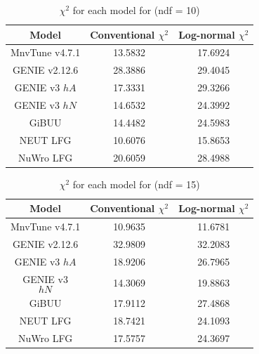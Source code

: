 \documentclass[aps,prl,twocolumn,showpacs,superscriptaddress,letterpaper,showkeys,superscriptaddress,floatfix,nofootinbib]{revtex4-1}
\begin{document}
\begin{table}[H]
  \centering
  \renewcommand{\arraystretch}{1.15}
  \caption{$\chi^2$ for each model for \ptmu (ndf = 10)}
    \begin{tabular}{c||c|c}
        Model & Conventional $\chi^2$ & Log-normal $\chi^2$ \\
        \hline
        \hline
            MnvTune v4.7.1 & 13.5832 & 17.6924\\
            GENIE v2.12.6 & 28.3886 & 29.4045\\
            GENIE v3 $hA$  & 17.3331 & 29.3266\\
            GENIE v3 $hN$  & 14.6532 & 24.3992\\ 
            GiBUU & 14.4482 & 24.5983\\ 
            NEUT LFG & 10.6076 & 15.8653\\
            NuWro LFG & 20.6059 & 28.4988\\ 
    \end{tabular}
  \label{tbl:chi2_ptmu}
\end{table}

\begin{table}[H]
  \centering
  \renewcommand{\arraystretch}{1.15}
  \caption{$\chi^2$ for each model for \thmu (ndf = 15)}
    \begin{tabular}{c||c|c}
        Model & Conventional $\chi^2$ & Log-normal $\chi^2$ \\
        \hline
        \hline
        MnvTune v4.7.1 & 10.9635 & 11.6781\\ 
        GENIE v2.12.6 & 32.9809 & 32.2083\\
        GENIE v3 $hA$  & 18.9206 & 26.7965\\
        GENIE v3 $$hN$$  & 14.3069 & 19.8863\\ 
        GiBUU & 17.9112 & 27.4868\\ 
        NEUT LFG & 18.7421 & 24.1093\\ 
        NuWro LFG & 17.5757 & 24.3697\\
    \end{tabular}
  \label{tbl:chi2_thmu}
\end{table}
\end{document}
